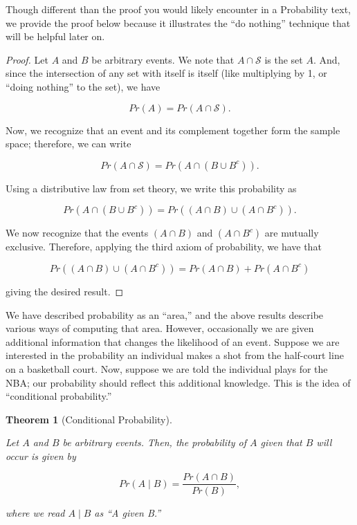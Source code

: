 \documentclass[
  letterpaper,
  DIV=11,
  numbers=noendperiod]{scrreprt}
\theoremstyle{definition}
\theoremstyle{definition}
\theoremstyle{plain}
\newtheorem{theorem}{Theorem}[chapter]
\theoremstyle{remark}
\begin{document}
Though different than the proof you would likely encounter in a
Probability text, we provide the proof below because it illustrates the
``do nothing'' technique that will be helpful later on.

\begin{proof}

Let \(A\) and \(B\) be arbitrary events. We note that
\(A \cap \mathcal{S}\) is the set \(A\). And, since the intersection of
any set with itself is itself (like multiplying by 1, or ``doing
nothing'' to the set), we have

\[Pr(A) = Pr(A \cap \mathcal{S}).\]

Now, we recognize that an event and its complement together form the
sample space; therefore, we can write

\[Pr(A \cap \mathcal{S}) = Pr\left(A \cap \left(B \cup B^c\right)\right).\]

Using a distributive law from set theory, we write this probability as

\[Pr\left(A \cap \left(B \cup B^c\right)\right) = Pr\left((A \cap B) \cup \left(A \cap B^c\right)\right).\]

We now recognize that the events \((A \cap B)\) and
\(\left(A \cap B^c\right)\) are mutually exclusive. Therefore, applying
the third axiom of probability, we have that

\[Pr\left((A \cap B) \cup \left(A \cap B^c\right)\right) = Pr(A \cap B) + Pr\left(A \cap B^c\right)\]

giving the desired result.

\end{proof}

We have described probability as an ``area,'' and the above results
describe various ways of computing that area. However, occasionally we
are given additional information that changes the likelihood of an
event. Suppose we are interested in the probability an individual makes
a shot from the half-court line on a basketball court. Now, suppose we
are told the individual plays for the NBA; our probability should
reflect this additional knowledge. This is the idea of ``conditional
probability.''

\begin{theorem}[Conditional
Probability]\protect\hypertarget{thm-conditional-probability}{}\label{thm-conditional-probability}

Let \(A\) and \(B\) be arbitrary events. Then, the probability of \(A\)
given that \(B\) will occur is given by

\[Pr(A \mid B) = \frac{Pr(A \cap B)}{Pr(B)},\]

where we read \(A \mid B\) as ``A given B.''

\end{theorem}
\end{document}
